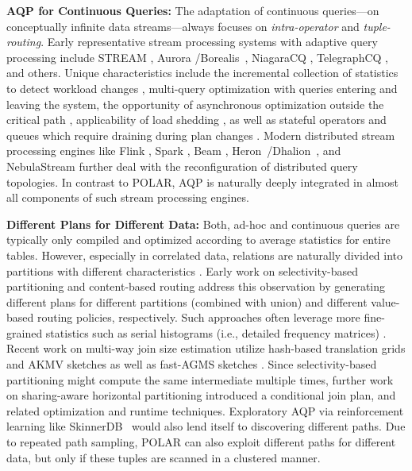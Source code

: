 \textbf{AQP for Continuous Queries:} The adaptation of continuous queries---on conceptually infinite data streams---always focuses on \emph{intra-operator} and \emph{tuple-routing}. Early representative stream processing systems with adaptive query processing include STREAM \cite{BabuW04}, Aurora \cite{AbadiCCCCLSTZ03}/Borealis~\cite{AbadiABCCHLMRRTXZ05}, NiagaraCQ \cite{ChenJDTW00}, TelegraphCQ \cite{ChandrasekaranDFHHKMRRS03}, and others. Unique characteristics include the incremental collection of statistics to detect workload changes \cite{BabuMMNW04}, multi-query optimization with queries entering and leaving the system, the opportunity of asynchronous optimization outside the critical path \cite{Boehm2011}, applicability of load shedding \cite{TatbulCZCS03}, as well as stateful operators and queues which require draining during plan changes \cite{WangFMWZ19}. Modern distributed stream processing engines like Flink \cite{AlexandrovBEFHHKLLMNPRSSHTW14}, Spark \cite{ZahariaDLHSS13}, Beam \cite{AkidauBCCFLMMPS15}, Heron~\cite{KulkarniBFKKMPR15}/Dhalion~\cite{FloratouAGRR17}, and NebulaStream \cite{ZeuchCMGGGBTM20} further deal with the reconfiguration of distributed query topologies. In contrast to POLAR, AQP is naturally deeply integrated in almost all components of such stream processing engines.

\textbf{Different Plans for Different Data:} Both, ad-hoc and continuous queries are typically only compiled and optimized according to average statistics for entire tables. However, especially in correlated data, relations are naturally divided into partitions with different characteristics \cite{TzoumasDJ10}. Early work on selectivity-based partitioning \cite{Polyzotis05} and content-based routing \cite{BizarroBDW05} address this observation by generating different plans for different partitions (combined with union) and different value-based routing policies, respectively. Such approaches often leverage more fine-grained statistics such as serial histograms (i.e., detailed frequency matrices) \cite{Ioannidis93}. Recent work on multi-way join size estimation \cite{MullerM22,IzenovDRS21} utilize hash-based translation grids \cite{MullerM22} and AKMV sketches \cite{BeyerHRSG07} as well as fast-AGMS sketches \cite{IzenovDRS21}. Since selectivity-based partitioning might compute the same intermediate multiple times, further work on sharing-aware horizontal partitioning \cite{TzoumasDJ10} introduced a conditional join plan, and related optimization and runtime techniques. Exploratory AQP via reinforcement learning like SkinnerDB~\cite{TrummerWMMJA19} would also lend itself to discovering different paths. Due to repeated path sampling, POLAR can also exploit different paths for different data, but only if these tuples are scanned in a clustered manner.

